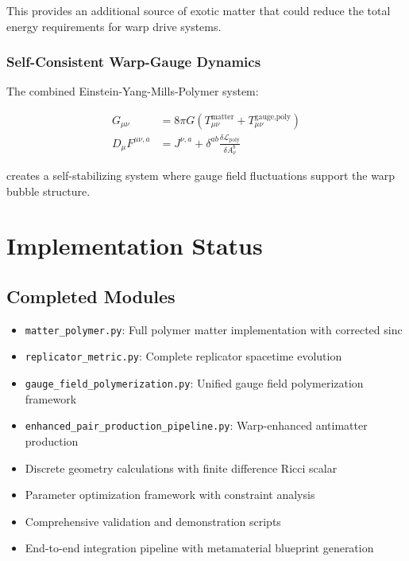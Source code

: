 \documentclass[11pt]{article}
\begin{document}
This provides an additional source of exotic matter that could reduce the total energy requirements for warp drive systems.

\subsubsection{Self-Consistent Warp-Gauge Dynamics}
The combined Einstein-Yang-Mills-Polymer system:

\begin{align}
G_{\mu\nu} &= 8\pi G \left(T_{\mu\nu}^{\text{matter}} + T_{\mu\nu}^{\text{gauge,poly}}\right) \\
D_\mu F^{\mu\nu,a} &= J^{\nu,a} + \delta^{ab} \frac{\delta \mathcal{L}_{\text{poly}}}{\delta A_\nu^b}
\end{align}

creates a self-stabilizing system where gauge field fluctuations support the warp bubble structure.

\section{Implementation Status}

\subsection{Completed Modules}
\begin{itemize}
\item \texttt{matter\_polymer.py}: Full polymer matter implementation with corrected sinc
\item \texttt{replicator\_metric.py}: Complete replicator spacetime evolution
\item \texttt{gauge\_field\_polymerization.py}: Unified gauge field polymerization framework
\item \texttt{enhanced\_pair\_production\_pipeline.py}: Warp-enhanced antimatter production
\item Discrete geometry calculations with finite difference Ricci scalar
\item Parameter optimization framework with constraint analysis
\item Comprehensive validation and demonstration scripts
\item End-to-end integration pipeline with metamaterial blueprint generation
\end{itemize}
\end{document}
